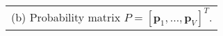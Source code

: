 \scriptsize
\begin{tabular}[t]{l}
	(b) Probability matrix $P = [\bm{p}_1, \ldots, \bm{p}_V]^T$.
\end{tabular}
